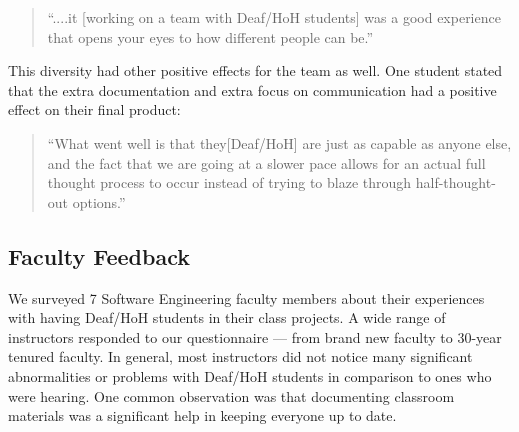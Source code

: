 \documentclass[conference]{IEEEtran}
\begin{document}
\begin{quotation}
``....it [working on a team with Deaf/HoH students] was a good experience that opens your eyes to how different people can be.''
\end{quotation}

This diversity had other positive effects for the team as well. One student stated that the extra documentation and extra focus on communication had a positive effect on their final product:

\begin{quotation}
``What went well is that they[Deaf/HoH] are just as capable as anyone else, and the fact that we are going at a slower pace allows for an actual full thought process to occur instead of trying to blaze through half-thought-out options.''
\end{quotation}

\subsection{Faculty Feedback}


We surveyed 7 Software Engineering faculty members about their experiences with having Deaf/HoH students in their class projects. A wide range of instructors responded to our questionnaire --- from brand new faculty to 30-year tenured faculty. In general, most instructors did not notice many significant abnormalities or problems with Deaf/HoH students in comparison to ones who were hearing. One common observation was that documenting classroom materials was a significant help in keeping everyone up to date.
\end{document}
